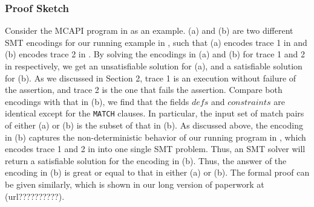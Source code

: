 \subsubsection{Proof Sketch}
Consider the MCAPI program in  as an example.
 (a) and (b) are two different SMT encodings for our running
example in , such that  (a) encodes trace 1 in  and  (b) encodes trace 2 in . By solving the encodings in  (a) and (b) for trace 1 and 2 in  respectively, we get an unsatisfiable solution for  (a), and a satisfiable solution for  (b). As we discussed in Section 2, trace 1 is an execution without failure of the assertion, and trace 2 is the one that fails the assertion. %
Compare both encodings with that in  (b), we find that the fields $\mathit{defs}$ and $\mathit{constraints}$ are identical except for the \texttt{MATCH} clauses. In particular, the input set of match pairs of either  (a) or (b) is the subset of that in  (b). As discussed above, the encoding in  (b) captures the non-deterministic behavior of our running program in , which encodes trace 1 and 2 in  into one single SMT problem. Thus, an SMT solver will return a satisfiable solution for the encoding in  (b). Thus, the answer of the encoding in  (b) is great or equal to that in either  (a) or (b). The formal proof can be given similarly, which is shown in our long version of paperwork at (url??????????).













